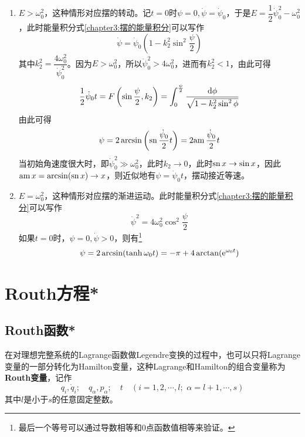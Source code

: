 \begin{enumerate}
\item $E>\omega_0^2$，这种情形对应摆的转动。记$t=0$时$\psi=0,\dot{\psi}=\dot{\psi}_0$，于是$E=\dfrac12\dot{\psi}_0^2-\omega_0^2$，此时能量积分式\eqref{chapter3:摆的能量积分}可以写作
\begin{equation}
	\dot{\psi} = \dot{\psi}_0\left(1-k_2^2\sin^2\dfrac{\psi}{2}\right)
\end{equation}
其中$k_2^2=\dfrac{4\omega_0^2}{\dot{\psi}_0^2}$。因为$E>\omega_0^2$，所以$\dot{\psi}_0^2>4\omega_0^2$，进而有$k_2^2<1$，由此可得
\begin{equation}
	\frac12 \dot{\psi}_0t=F\left(\sin\dfrac{\psi}{2},k_2\right) = \int_0^{\frac{\psi}{2}}\frac{\mathrm{d}\phi}{\sqrt{1-k_2^2\sin^2\phi}}
\end{equation}
由此可得
\begin{equation}
	\psi = 2\arcsin\left(\mathrm{sn}\,\dfrac{\dot{\psi}_0}{2}t\right) = 2\mathrm{am}\,\dfrac{\dot{\psi}_0}{2}t
\end{equation}
当初始角速度很大时，即$\dot{\psi}_0^2\gg\omega_0^2$，此时$k_2\to 0$，此时$\mathrm{sn}\, x\to \sin x$，因此$\mathrm{am}\, x=\arcsin (\mathrm{sn}\, x)\to x$，则近似地有$\psi=\dot{\psi}_0t$，摆动接近等速。

\item $E=\omega_0^2$，这种情形对应摆的渐进运动。此时能量积分式\eqref{chapter3:摆的能量积分}可以写作
\begin{equation}
	\dot{\psi}^2=4\omega_0^2\cos^2\frac{\psi}{2}
\end{equation}
如果$t=0$时，$\psi=0,\dot{\psi}>0$，则有\footnote{最后一个等号可以通过导数相等和$0$点函数值相等来验证。}
\begin{equation}
	\psi = 2\arcsin(\tanh \omega_0t) = -\pi+4\arctan(\mathrm{e}^{\omega_0t})
\end{equation}
\end{enumerate}

\section{Routh方程*}

\subsection{Routh函数*}

在对理想完整系统的Lagrange函数做Legendre变换的过程中，也可以只将Lagrange变量的一部分转化为Hamilton变量，这种Lagrange和Hamilton的组合变量称为{\bf Routh变量}，记作
\begin{equation*}
	q_i,\dot{q}_i;\quad q_\alpha,p_\alpha; \quad t\quad (i=1,2,\cdots,l;\,\,\alpha=l+1,\cdots,s)
\end{equation*}
其中$l$是小于$s$的任意固定整数。

